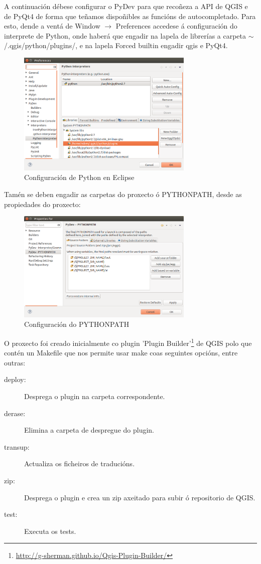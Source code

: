 A continuación débese configurar o PyDev para que recoñeza a API de QGIS e de PyQt4 de forma que teñamos dispoñibles as funcións de autocompletado. Para esto, dende a ventá de Window $\to$ Preferences accedese á configuración do interprete de Python, onde haberá que engadir na lapela de librerías a carpeta $\sim$/.qgis/python/plugins/, e na lapela Forced builtin engadir qgis e PyQt4.
\begin{figure}[H]
\centering
\includegraphics[width=0.75\textwidth]{images/manualtecnico/python_settings.png}
\caption{Configuración de Python en Eclipse}
\label{fig:python_settings}
\end{figure}

Tamén se deben engadir as carpetas do proxecto ó PYTHONPATH, desde as propiedades do proxecto:
\begin{figure}[H]
\centering
\includegraphics[width=0.75\textwidth]{images/manualtecnico/python_path.png}
\caption{Configuración do PYTHONPATH}
\label{fig:python_path}
\end{figure}


O proxecto foi creado inicialmente co plugin 'Plugin Builder'\footnote{\url{http://g-sherman.github.io/Qgis-Plugin-Builder/}} de QGIS polo que contén un Makefile que nos permite usar make coas seguintes opcións, entre outras:
\begin{description}
\item[deploy:] Desprega o plugin na carpeta correspondente.
\item[derase:] Elimina a carpeta de despregue do plugin.
\item[transup:] Actualiza os ficheiros de traducións.
\item[zip:] Desprega o plugin e crea un zip axeitado para subir ó repositorio de QGIS.
\item[test:] Executa os tests.
\end{description}

